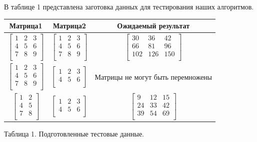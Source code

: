 \documentclass[a4paper,14pt]{article} %
\begin{document}
	В таблице 1 представлена заготовка данных для тестирования наших алгоритмов. 
	\begin{center}
		\begin{tabular}{  | c | c | c | }
			\hline
			\textbf{Матрица1} & \textbf{Матрица2} & \textbf{Ожидаемый результат} \\ \hline
			$\begin{bmatrix} 
   			1&2&3 \\
    			4&5&6 \\ 
   			7&8&9 \\ 
			\end{bmatrix}$ & 
			$\begin{bmatrix} 
   			1&2&3 \\
    			4&5&6 \\ 
   			7&8&9 \\ 
			\end{bmatrix}$ &
			$\begin{bmatrix} 
   			30&36&42 \\
    			66&81&96 \\ 
   			102&126&150 \\ 
			\end{bmatrix} $ \\ \hline
			
			$\begin{bmatrix} 
   			1&2&3 \\
    			4&5&6 \\ 
   			7&8&9 \\ 
			\end{bmatrix}$ & 
			$\begin{bmatrix} 
   			1&2&3 \\
    			4&5&6 \\ 
			\end{bmatrix}$ &
			$\text{Матрицы не могут быть перемножены}$ \\ \hline
			
			$\begin{bmatrix} 
   			1&2 \\
    			4&5 \\ 
   			7&8 \\ 
			\end{bmatrix}$ & 
			$\begin{bmatrix} 
   			1&2&3 \\
    			4&5&6 \\ 
			\end{bmatrix}$ &
			$\begin{bmatrix} 
   			9&12&15 \\
    			24&33&42 \\ 
   			39&54&69 \\ 
			\end{bmatrix} $ \\ \hline
		\end{tabular}
		
		\hfill
		
		Таблица 1.
		Подготовленные тестовые данные.  
	\end{center}
	
\end{document}
